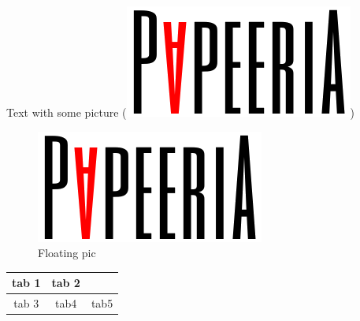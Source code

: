 \documentclass{article}
\begin{document}
\vspace*{\fill} \vspace*{-5ex}

Text with some picture (\includegraphics[scale=0.3]{papeeria.png})
\begin{figure}[tbp]

        \includegraphics{papeeria.png}
    \caption{Floating pic}
\end{figure}

\begin{tabular}{|cc|c|}
\hline
tab 1 & tab 2&\\\hline
tab 3 & tab4&tab5\\\hline\hline
\end{tabular}


\vspace*{\fill}
\end{document}
